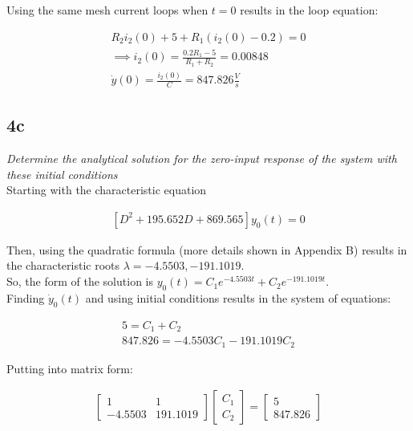 \documentclass[10pt, AMS Euler]{article}
\begin{document}
Using the same mesh current loops when $t=0$ results in the loop equation:
\begin{center}
    \begin{align*}
        R_2i_2(0) + 5 + R_1(i_2(0) - 0.2) = 0\\
        \implies i_2(0) = \frac{0.2R_1 - 5}{R_1 + R_2} = 0.00848\\
        \dot{y}(0) = \frac{i_2(0)}{C} = 847.826 \frac{V}{s}
    \end{align*}
\end{center}

\subsection*{4c}
\textit{Determine the analytical solution for the zero-input response of the system with these initial
conditions}\\

Starting with the characteristic equation 
\begin{center}
    \begin{align*}
        \left[ D^2 + 195.652D + 869.565 \right]y_0(t) = 0
    \end{align*}
\end{center}

Then, using the quadratic formula (more details shown in Appendix B) results in the characteristic roots $\lambda = -4.5503, -191.1019$.\\

So, the form of the solution is $y_0(t) = C_1e^{-4.5503t} + C_2e^{-191.1019t}$.\\

Finding $\dot{y}_0(t)$ and using initial conditions results in the system of equations: 
\begin{center}
    \begin{align*}
        5 = C_1 + C_2\\
        847.826 = -4.5503C_1 - 191.1019C_2
    \end{align*}
\end{center}

Putting into matrix form:
\begin{center}
    \begin{align*}
        \begin{bmatrix}
        1 & 1\\
        -4.5503 & 191.1019
        \end{bmatrix}
        \begin{bmatrix}
        C_1\\
        C_2
        \end{bmatrix} = 
        \begin{bmatrix}
        5\\
        847.826
        \end{bmatrix}
    \end{align*}
\end{center}
\end{document}
